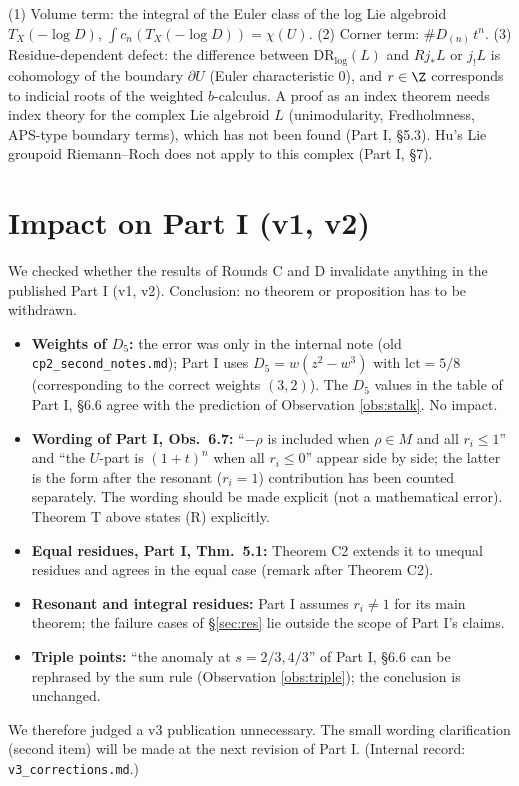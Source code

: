 \begin{obs}
(1) Volume term: the integral of the Euler class of the log Lie algebroid $T_X(-\log D)$, $\int c_n(T_X(-\log D))=\chi(U)$. (2) Corner term: $\#D_{(n)}\,t^n$. (3) Residue-dependent defect: the difference between $\mathrm{DR}_{\log}(L)$ and $Rj_*L$ or $j_!L$ is cohomology of the boundary $\partial U$ (Euler characteristic $0$), and $r\in\Z$ corresponds to indicial roots of the weighted $b$-calculus. A proof as an index theorem needs index theory for the complex Lie algebroid $L$ (unimodularity, Fredholmness, APS-type boundary terms), which has not been found (Part I, \S5.3). Hu's Lie groupoid Riemann--Roch does not apply to this complex (Part I, \S7).
\end{obs}

\section{Impact on Part I (v1, v2)}\label{sec:chk}
We checked whether the results of Rounds C and D invalidate anything in the published Part I (v1, v2). Conclusion: no theorem or proposition has to be withdrawn.

\begin{itemize}
\item \textbf{Weights of $D_5$:} the error was only in the internal note (old \texttt{cp2\_second\_notes.md}); Part I uses $D_5=w(z^2-w^3)$ with $\mathrm{lct}=5/8$ (corresponding to the correct weights $(3,2)$). The $D_5$ values in the table of Part I, \S6.6 agree with the prediction of Observation \ref{obs:stalk}. No impact.\tV
\item \textbf{Wording of Part I, Obs.\ 6.7:} ``$-\rho$ is included when $\rho\in M$ and all $r_i\le1$'' and ``the $U$-part is $(1+t)^n$ when all $r_i\le0$'' appear side by side; the latter is the form after the resonant ($r_i=1$) contribution has been counted separately. The wording should be made explicit (not a mathematical error). Theorem T above states (R) explicitly.
\item \textbf{Equal residues, Part I, Thm.\ 5.1:} Theorem C2 extends it to unequal residues and agrees in the equal case (remark after Theorem C2).
\item \textbf{Resonant and integral residues:} Part I assumes $r_i\ne1$ for its main theorem; the failure cases of \S\ref{sec:res} lie outside the scope of Part I's claims.
\item \textbf{Triple points:} ``the anomaly at $s=2/3,4/3$'' of Part I, \S6.6 can be rephrased by the sum rule (Observation \ref{obs:triple}); the conclusion is unchanged.
\end{itemize}
We therefore judged a v3 publication unnecessary. The small wording clarification (second item) will be made at the next revision of Part I. (Internal record: \texttt{v3\_corrections.md}.)

